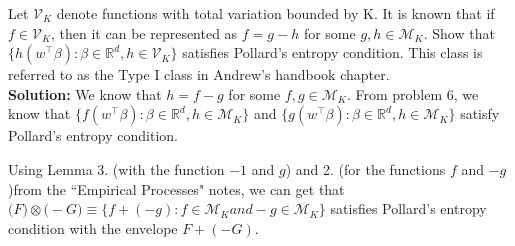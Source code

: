 \documentclass[11pt,letterpaper]{article}                  %
\begin{document}
\bigskip
\begin{problem}

\end{problem}

\bigskip
\begin{problem} Let $\mathcal{V}_K$ denote functions with total variation bounded by K. It is known that if $f \in \mathcal{V}_K$, then it can be represented as $f = g - h$ for some $g, h \in \mathcal{M}_K.$ Show that $\{h(w^\intercal \beta): \beta \in \mathbb{R}^d, h \in \mathcal{V}_K \}$ satisfies Pollard's entropy condition. This class is referred to as the Type I class in Andrew's handbook chapter. \\
	
	\textbf{Solution:} We know that $h = f - g$ for some $f, g \in \mathcal{M}_K$. From problem 6, we know that $\{f(w^\intercal \beta): \beta \in \mathbb{R}^d, h \in \mathcal{M}_K \}$ and $\{g(w^\intercal \beta): \beta \in \mathbb{R}^d, h \in \mathcal{M}_K \}$ satisfy Pollard's entropy condition.  
	
	Using Lemma 3. (with the function $-1$ and $g$) and 2. (for the functions $f$ and $-g$)from the ``Empirical Processes" notes, we can get that $\mathfrak(F) \otimes \mathfrak(-G) \equiv \{f + (-g): f \in \mathcal{M}_K and -g \in \mathcal{M}_K \}$ satisfies Pollard's entropy condition with the envelope $F + (-G)$.   

\end{problem}
\end{document}
